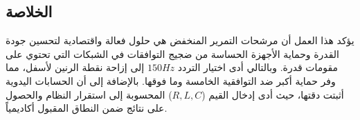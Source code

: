 \subsection{الخلاصة}

يؤكد هذا العمل أن مرشحات التمرير المنخفض  هي حلول فعالة واقتصادية لتحسين جودة القدرة وحماية الأجهزة الحساسة من ضجيج التوافقات في الشبكات التي تحتوي على مقومات قدرة. وبالتالي أدى اختيار التردد $150 Hz$ إلى إزاحة نقطة الرنين لأسفل، مما وفر حماية أكبر ضد التوافقية الخامسة وما فوقها. بالإضافة إلى أن الحسابات اليدوية أثبتت دقتها، حيث أدى إدخال القيم ($R, L, C$) المحسوبة إلى استقرار النظام والحصول على نتائج ضمن النطاق المقبول أكاديمياً.
